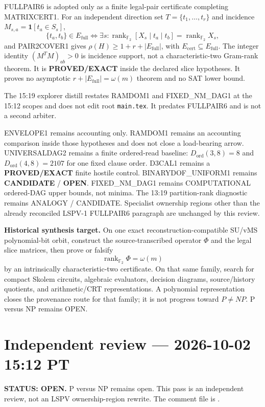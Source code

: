 \documentclass[11pt]{article}
\begin{document}
FULLPAIR6 is adopted only as a finite legal-pair certificate completing MATRIXCERT1.
For an independent direction set \(T=\{t_1,\ldots,t_r\}\) and incidence
\(M_{s,a}=\mathbf{1}[t_a\in S_s]\),
\[
\{t_a,t_b\}\in E_{\mathrm{full}}
\iff
\exists s:\operatorname{rank}_{\mathbb F_2}[X_s\mid t_a\mid t_b]
=\operatorname{rank}_{\mathbb F_2}X_s,
\]
and PAIR2COVER1 gives \(\rho(H)\ge 1+r+|E_{\mathrm{full}}|\), with
\(E_{\mathrm{cert}}\subseteq E_{\mathrm{full}}\). The integer identity
\((M^TM)_{ab}>0\) is incidence support, not a characteristic-two Gram-rank theorem.
It is \textbf{PROVED/EXACT} inside the declared slice hypotheses. It proves no asymptotic
\(r+|E_{\mathrm{full}}|=\omega(m)\) theorem and no SAT lower bound.

The 15:19 explorer distill
restates RAMDOM1 and FIXED\_NM\_DAG1 at the 15:12 scopes and does not edit root
\texttt{main.tex}. It predates FULLPAIR6 and is not a second arbiter.

ENVELOPE1 remains accounting only. RAMDOM1 remains an accounting comparison inside those
hypotheses and does not close a load-bearing arrow. UNIVERSALDAG2 remains a finite
ordered-read baseline: \(D_{\mathrm{ord}}(3,8)=8\) and \(D_{\mathrm{ord}}(4,8)=2107\) for
one fixed clause order. D3CAL1 remains a \textbf{PROVED/EXACT} finite hostile control.
BINARYDOF\_UNIFORM1 remains \textbf{CANDIDATE} / \textbf{OPEN}. FIXED\_NM\_DAG1 remains
COMPUTATIONAL ordered-DAG upper bounds, not minima. The 13:19 partition-rank diagnostic
remains ANALOGY / CANDIDATE. Specialist ownership regions other than the already reconciled
LSPV-1 FULLPAIR6 paragraph are unchanged by this review.

\begin{candidatebox}
\textbf{Historical synthesis target.}
On one exact reconstruction-compatible SU/vMS polynomial-bit orbit, construct the
source-transcribed operator \(\Phi\) and the legal slice matrices, then prove or falsify
\[
\operatorname{rank}_{\mathbb F_2}\Phi=\omega(m)
\]
by an intrinsically characteristic-two certificate. On that same family, search for compact
Skolem circuits, algebraic evaluators, decision diagrams, source/history quotients, and
arithmetic/CRT representations. A polynomial representation closes the provenance route for
that family; it is not progress toward \(P\neq NP\). P versus NP remains OPEN.
\end{candidatebox}


\section{Independent review --- 2026-10-02 15:12 PT}
\textbf{STATUS: OPEN.} P versus NP remains open. This pass is an independent review, not an
LSPV ownership-region rewrite. The comment file is
.
\end{document}
